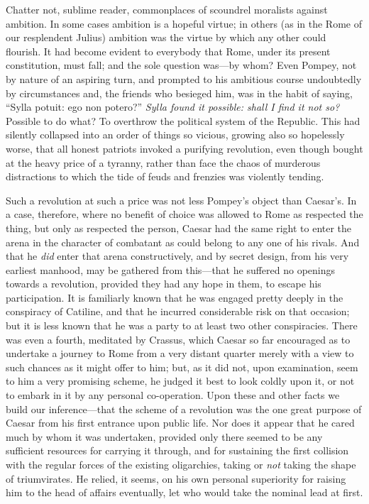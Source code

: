 Chatter not, sublime reader, commonplaces of scoundrel moralists against
ambition. In some cases ambition is a hopeful virtue; in others (as in
the Rome of our resplendent Julius) ambition was the virtue by which any
other could flourish. It had become evident to everybody that Rome,
under its present constitution, must fall; and the sole question was—by
whom? Even Pompey, not by nature of an aspiring turn, and prompted to
his ambitious course undoubtedly by circumstances and, the friends who
besieged him, was in the habit of saying, ``Sylla potuit: ego non
potero?'' \emph{Sylla found it possible: shall I find it not so?} Possible to
do what? To overthrow the political system of the Republic. This had
silently collapsed into an order of things so vicious, growing also so
hopelessly worse, that all honest patriots invoked a purifying
revolution, even though bought at the heavy price of a tyranny, rather
than face the chaos of murderous distractions to which the tide of feuds
and frenzies was violently tending.

Such a revolution at such a price was not less Pompey's object than
Caesar's. In a case, therefore, where no benefit of choice was allowed
to Rome as respected the thing, but only as respected the person, Caesar
had the same right to enter the arena in the character of combatant as
could belong to any one of his rivals. And that he \emph{did} enter that
arena constructively, and by secret design, from his very earliest
manhood, may be gathered from this—that he suffered no openings towards
a revolution, provided they had any hope in them, to escape his
participation. It is familiarly known that he was engaged pretty deeply
in the conspiracy of Catiline, and that he incurred considerable risk on
that occasion; but it is less known that he was a party to at least two
other conspiracies. There was even a fourth, meditated by Crassus, which
Caesar so far encouraged as to undertake a journey to Rome from a very
distant quarter merely with a view to such chances as it might offer to
him; but, as it did not, upon examination, seem to him a very promising
scheme, he judged it best to look coldly upon it, or not to embark in it
by any personal co-operation. Upon these and other facts we build our
inference—that the scheme of a revolution was the one great purpose of
Caesar from his first entrance upon public life. Nor does it appear that
he cared much by whom it was undertaken, provided only there seemed to
be any sufficient resources for carrying it through, and for sustaining
the first collision with the regular forces of the existing oligarchies,
taking or \emph{not} taking the shape of triumvirates. He relied, it seems,
on his own personal superiority for raising him to the head of affairs
eventually, let who would take the nominal lead at first.


